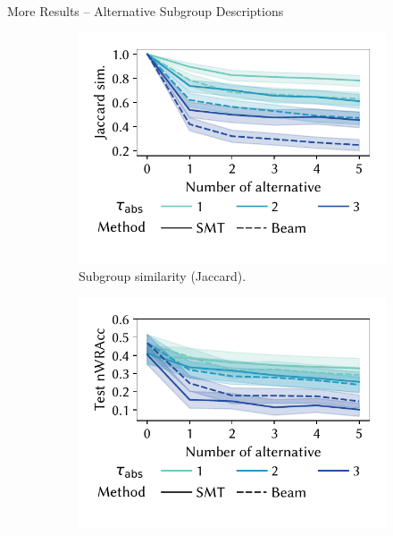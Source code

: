 \documentclass[en, navbaroff, handout]{sdqbeamer}
\begin{document}
\begin{frame}[t]{More Results -- Alternative Subgroup Descriptions}
	\begin{figure}
		\centering
		\begin{subfigure}[t]{0.4\textwidth}
			\centering
			\includegraphics[width=\textwidth, trim=10 25 10 10, clip]{plots/csd-alternatives-jaccard.pdf}
			\caption{Subgroup similarity (Jaccard).}
			\label{fig:csd:alternatives-jaccard}
		\end{subfigure}
		\hspace{\kitcolumnsep}
		\begin{subfigure}[t]{0.4\textwidth}
			\centering
			\includegraphics[width=\textwidth, trim=10 25 10 10, clip]{plots/csd-alternatives-test-nwracc.pdf}

\end{subfigure}
\end{figure}
\end{frame}
\end{document}

